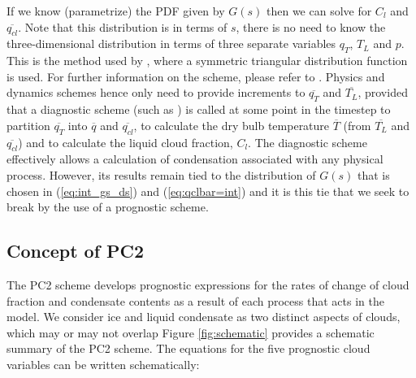 \documentclass{UMDP_article}
\begin{document}
If we know (parametrize) the PDF given by $G(s)$ then we can solve
for $C_l$ and $\overline{q_{cl}}$. Note that this distribution is in terms of
$s$, there is no need to know the three-dimensional distribution in terms
of three separate variables $q_T$, $T_L$ and $p$. This is the method used
by \cite{smith90}, where a
symmetric triangular distribution function is used. For further
information on the \cite{smith90} scheme, please refer to . Physics and dynamics schemes hence only need to
provide increments to $\overline{q_T}$ and $\overline{T_L}$,
provided that a diagnostic scheme (such as \cite{smith90}) is called at some point in the
timestep to partition $\overline{q_T}$ into $\overline{q}$ and $\overline{q_{cl}}$,
to calculate the dry bulb temperature $\overline{T}$ (from $\overline{T_L}$
and $\overline{q_{cl}}$) and to calculate the liquid
cloud fraction, $C_l$. The diagnostic scheme effectively allows a calculation of
condensation associated with any physical process. However, its results remain
tied to the distribution of $G(s)$ that is chosen in (\ref{eq:int_gs_ds}) and
(\ref{eq:qclbar=int}) and it is this tie that we seek to break by the use of
a prognostic scheme.

\subsection{Concept of PC2}

The PC2 scheme develops prognostic expressions for the rates of change of
cloud fraction and condensate contents as a result of each process that acts in
the model. We consider ice and liquid condensate as two distinct
aspects of clouds, which may or may not overlap 
Figure \ref{fig:schematic} provides a schematic summary of the PC2 scheme.  
The equations for the five prognostic cloud variables can be written schematically: 
\end{document}
